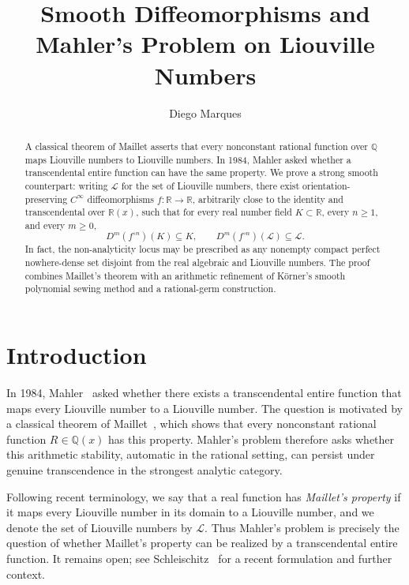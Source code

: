 \documentclass[11pt,reqno]{amsart}
\title[Smooth Diffeomorphisms and Mahler's Problem]
{Smooth Diffeomorphisms and Mahler's Problem on Liouville Numbers}
\author{Diego Marques}
\numberwithin{equation}{section}
\theoremstyle{definition}
\theoremstyle{remark}
\newcommand{\R}{\mathbb R}
\newcommand{\Q}{\mathbb Q}
\newcommand{\Lio}{\mathscr L}
\begin{document}
\begin{abstract}
A classical theorem of Maillet asserts that every nonconstant rational
function over $\Q$ maps Liouville numbers to Liouville numbers. In 1984,
Mahler asked whether a transcendental entire function can have the same
property. We prove a strong smooth counterpart: writing $\Lio$ for the set
of Liouville numbers, there exist orientation-preserving $C^\infty$
diffeomorphisms $f:\R\to\R$, arbitrarily close to the identity and
transcendental over $\R(x)$, such that for every real number field
$K\subset\R$, every $n\geq1$, and every $m\geq0$,
\[
D^m(f^{\circ n})(K)\subseteq K,
\qquad
D^m(f^{\circ n})(\Lio)\subseteq\Lio.
\]
In fact, the non-analyticity locus may be prescribed as any nonempty compact perfect nowhere-dense set disjoint from the real algebraic and Liouville numbers. The proof combines Maillet's theorem with an arithmetic refinement
of K\"orner's smooth polynomial sewing method and a rational-germ construction.
\end{abstract}

\maketitle

\section{Introduction}

In 1984, Mahler~\cite{Mahler1984} asked whether there exists a transcendental
entire function that maps every Liouville number to a Liouville number. The
question is motivated by a classical theorem of Maillet~\cite{Maillet1906},
which shows that every nonconstant rational function $R\in\mathbb Q(x)$ has
this property. Mahler's problem therefore asks whether this arithmetic
stability, automatic in the rational setting, can persist under genuine
transcendence in the strongest analytic category.

Following recent terminology, we say that a real function has
\emph{Maillet's property} if it maps every Liouville number in its domain to
a Liouville number, and we denote the set of Liouville numbers by $\Lio$.
Thus Mahler's problem is precisely the question of whether Maillet's property
can be realized by a transcendental entire function. It remains open; see
Schleischitz~\cite{Schleischitz2025} for a recent formulation and further
context.
\end{document}
